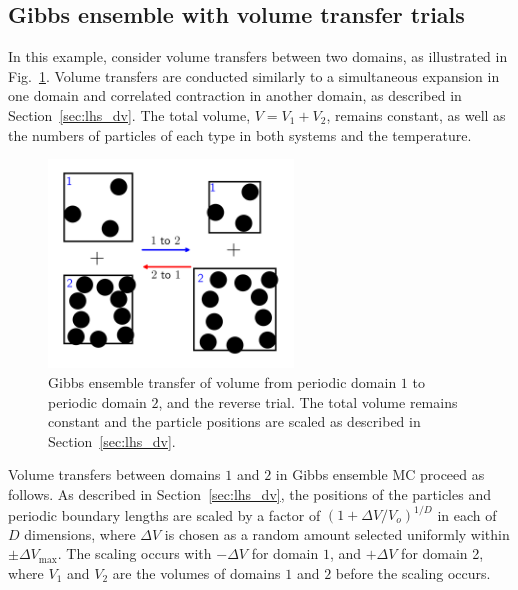 \documentclass[
  9pt,
  bestpractices,
]{livecoms}
\begin{document}
\begin{figure}

\end{figure}

\subsection{\label{sec:lhs_gibbs_volume}Gibbs ensemble with volume transfer trials}

In this example, consider volume transfers between two domains, as illustrated in Fig.~\ref{fig:gibbs_volume}.
Volume transfers are conducted similarly to a simultaneous expansion in one domain and correlated contraction in another domain, as described in Section~\ref{sec:lhs_dv}.
The total volume, $V=V_1+V_2$, remains constant, as well as the numbers of particles of each type in both systems and the temperature.

\begin{figure}
\begin{centering}
\includegraphics[width=6.5cm]{../figures/gibbs_volume.png}
\caption{
Gibbs ensemble transfer of volume from periodic domain $1$ to periodic domain $2$, and the reverse trial.
The total volume remains constant and the particle positions are scaled as described in Section~\ref{sec:lhs_dv}.
}
\label{fig:gibbs_volume}
\end{centering}
\end{figure}

Volume transfers between domains $1$ and $2$ in Gibbs ensemble MC proceed as follows.
As described in Section~\ref{sec:lhs_dv}, the positions of the particles and periodic boundary lengths are scaled by a factor of $(1+\Delta V/V_o)^{1/D}$ in each of $D$ dimensions, where $\Delta V$ is chosen as a random amount selected uniformly within $\pm\Delta V_{\mathrm{max}}$.
The scaling occurs with $-\Delta V$ for domain $1$, and $+\Delta V$ for domain 2, where $V_1$ and $V_2$ are the volumes of domains $1$ and $2$ before the scaling occurs.
\end{document}
